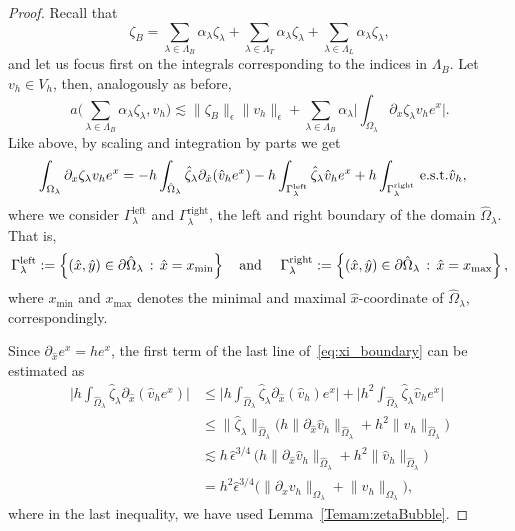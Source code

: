 \documentclass{article}
\newcommand{\est}{\text{\,e.s.t.}\xspace}
\newcommand{\summLA}[1][{}]{\ensuremath{\sum_{\lambda\in\Lambda_{#1}}\alpha_\lambda}}
\newcommand{\Gammaleft}{\ensuremath{\Gamma_\lambda^{\text{left}}}\xspace}
\newcommand{\Gammaright}{\ensuremath{\Gamma_\lambda^{\text{right}}}\xspace}
\begin{document}
\begin{proof}
Recall that
\[\zeta_B = \summLA[B]\zeta_\lambda+ \summLA[T]\zeta_\lambda+
\summLA[L]\zeta_\lambda,\]
and let us focus first on the integrals corresponding to the indices in $\Lambda_B$. 
Let $v_h\in V_h$, then, analogously as before,
\begin{equation}\label{Eq:79}
a\big(\summLA[B]\zeta_\lambda,v_h\big)  \lesssim 
\big\|\zeta_B\big\|_\epsilon \big\|v_h\big\|_\epsilon + \summLA[B] \Big|\int_{\Omega_\lambda} \partial_x \zeta_\lambda v_h e^x\Big|.
\end{equation}
Like above, by scaling and integration by parts we get
\begin{equation}\label{eq:xi_boundary}
\begin{aligned}
   \int_{\Omega_\lambda} \partial_x \zeta_\lambda v_h e^x 
  &= -h\int_{\hat{\Omega}_\lambda} \hat{\zeta}_\lambda \partial_{\hat{x}}(\hat{v}_h e^x)
  - h\int_{\Gammaleft} \hat{\zeta}_\lambda \hat{v}_h e^x  + h\int_{\Gammaright} \text{\est } \hat{v}_h,
\end{aligned}
\end{equation}
where we consider $\Gammaleft$ and $\Gammaright$, the left and right boundary of the domain $\hat{\Omega}_\lambda$. That is,
\begin{equation*}
 \Gammaleft := \left\{ (\hat{x}, \hat{y}) \in \partial \hat{\Omega}_\lambda \,:\, \hat{x} = x_{\min} \right\}\text{\quad and \quad}
 \Gammaright := \left\{ (\hat{x}, \hat{y}) \in \partial \hat{\Omega}_\lambda \,:\, \hat{x} = x_{\max} \right\},
\end{equation*}
where $x_{\min}$ and $x_{\max}$ denotes the minimal and maximal $\hat{x}$-coordinate of $\hat{\Omega}_\lambda$, correspondingly.

Since $\partial_{\hat{x}} e^x = h e^x$, the first term of the last line of~\eqref{eq:xi_boundary} can be estimated as
\begin{equation}\label{Eq:77}
\begin{aligned}
\Big|h\int_{\hat{\Omega}_\lambda} \hat{\zeta}_\lambda \partial_{\hat{x}}(\hat{v}_h e^x)\Big|
 &\leq \Big|h\int_{{\hat{\Omega}_\lambda}} \hat{\zeta}_\lambda \partial_{\hat{x}}(\hat{v}_h) e^x\Big|
+ \Big|h^2\int_{\hat{\Omega}_\lambda} \hat{\zeta}_\lambda \hat{v}_h e^x\Big|
\\
&\le \|\hat{\zeta}_\lambda\|_{\hat{\Omega}_\lambda}
\big( h\big\|\partial_{\hat{x}} \hat{v}_h\big\|_{\hat{\Omega}_\lambda} +h^2 \big\| \hat{v}_h\big\|_{\hat{\Omega}_\lambda}\big)
\\
&\lesssim h \, \hat{\epsilon}^{3/4} \, \big(h\big\|\partial_{\hat{x}} \hat{v}_h\big\|_{\hat{\Omega}_\lambda} +h^2 \big\| \hat{v}_h\big\|_{\hat{\Omega}_\lambda}\big)
\\
&= h^2\hat{\epsilon}^{3/4} \big(\big\|\partial_x v_h\big\|_{\Omega_\lambda} +\big\|v_h\big\|_{\Omega_\lambda}\big),
\end{aligned}
\end{equation}
where in the last inequality, we have used Lemma~\ref{Temam:zetaBubble}.


\end{proof}
\end{document}

